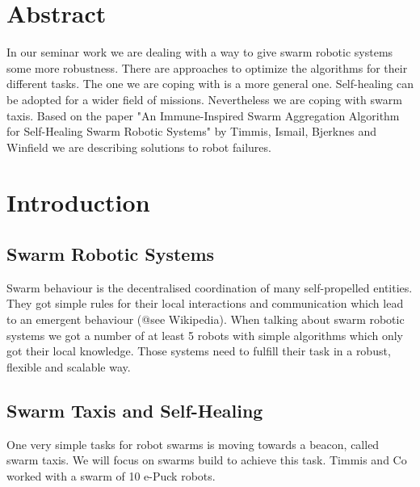 \documentclass[
	a4paper,
	article,
	pagesize,
	pdftex,
	12pt,
	english,
	fleqn,
	final,
	]{scrartcl}
\begin{document}

\makeTitel

\tableofcontents
\clearpage

\section{Abstract}
In our seminar work we are dealing with a way to give swarm robotic systems some more robustness. There are approaches to optimize the algorithms for their different tasks. The one we are coping with is a more general one. Self-healing can be adopted for a wider field of missions. Nevertheless we are coping with swarm taxis. Based on the paper "An Immune-Inspired Swarm Aggregation Algorithm for Self-Healing Swarm Robotic Systems" by Timmis, Ismail, Bjerknes and Winfield we are describing solutions to robot failures.

\section{Introduction}

\subsection{Swarm Robotic Systems}
Swarm behaviour is the decentralised coordination of many self-propelled entities. They got simple rules for their local interactions and communication which lead to an emergent behaviour (@see Wikipedia). 
When talking about swarm robotic systems we got a number of at least 5 robots with simple algorithms which only got their local knowledge.
Those systems need to fulfill their task in a robust, flexible and scalable way.

\subsection{Swarm Taxis and Self-Healing}
One very simple tasks for robot swarms is moving towards a beacon, called swarm taxis. We will focus on swarms build to achieve this task. Timmis and Co worked with a swarm of 10 e-Puck robots.
\end{document}
